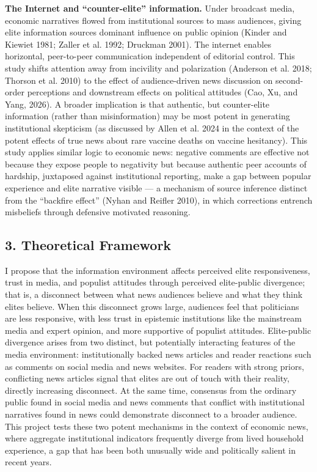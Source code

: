 \documentclass[
  12pt]{article}
\begin{document}
\textbf{The Internet and ``counter-elite'' information.} Under broadcast
media, economic narratives flowed from institutional sources to mass
audiences, giving elite information sources dominant influence on public
opinion (Kinder and Kiewiet 1981; {Zaller et al.} 1992; Druckman 2001).
The internet enables horizontal, peer-to-peer communication independent
of editorial control. This study shifts attention away from incivility
and polarization (Anderson et al. 2018; Thorson et al. 2010) to the
effect of audience-driven news discussion on second-order perceptions
and downstream effects on political attitudes (Cao, Xu, and Yang, 2026).
A broader implication is that authentic, but counter-elite information
(rather than misinformation) may be most potent in generating
institutional skepticism (as discussed by Allen et al. 2024 in the
context of the potent effects of true news about rare vaccine deaths on
vaccine hesitancy). This study applies similar logic to economic news:
negative comments are effective not because they expose people to
negativity but because authentic peer accounts of hardship, juxtaposed
against institutional reporting, make a gap between popular experience
and elite narrative visible --- a mechanism of source inference distinct
from the ``backfire effect'' (Nyhan and Reifler 2010), in which
corrections entrench misbeliefs through defensive motivated reasoning.

\subsection{3. Theoretical Framework}\label{theoretical-framework}

I propose that the information environment affects perceived elite
responsiveness, trust in media, and populist attitudes through perceived
elite-public divergence; that is, a disconnect between what news
audiences believe and what they think elites believe. When this
disconnect grows large, audiences feel that politicians are less
responsive, with less trust in epistemic institutions like the
mainstream media and expert opinion, and more supportive of populist
attitudes. Elite-public divergence arises from two distinct, but
potentially interacting features of the media environment:
institutionally backed news articles and reader reactions such as
comments on social media and news websites. For readers with strong
priors, conflicting news articles signal that elites are out of touch
with their reality, directly increasing disconnect. At the same time,
consensus from the ordinary public found in social media and news
comments that conflict with institutional narratives found in news could
demonstrate disconnect to a broader audience. This project tests these
two potent mechanisms in the context of economic news, where aggregate
institutional indicators frequently diverge from lived household
experience, a gap that has been both unusually wide and politically
salient in recent years.
\end{document}
